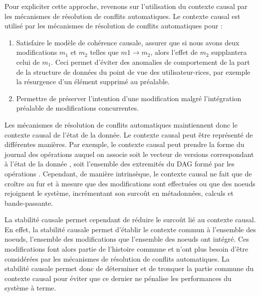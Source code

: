 Pour expliciter cette approche, revenons sur l'utilisation du contexte causal par les mécanismes de résolution de conflits automatiques.
Le contexte causal est utilisé par les mécanismes de résolution de conflits automatiques pour :
\begin{enumerate}
    \item Satisfaire le modèle de cohérence causale, \ie assurer que si nous avons deux modifications $m_1$ et $m_2$ telles que $m1 \to m_2$, alors l'effet de $m_2$ supplantera celui de $m_1$.
        Ceci permet d'éviter des anomalies de comportement de la part de la structure de données du point de vue des utilisateur-rices, par exemple la résurgence d'un élément supprimé au préalable.
    \item Permettre de préserver l'intention d'une modification malgré l'intégration préalable de modifications concurrentes.
\end{enumerate}


Les mécanismes de résolution de conflits automatiques maintiennent donc le contexte causal de l'état de la donnée.
Le contexte causal peut être représenté de différentes manières.
Par exemple, le contexte causal peut prendre la forme du journal des opérations auquel on associe soit le vecteur de versions correspondant à l'état de la donnée \cite{1988-version-vector-mattern,1991-version-vector-fidge}, soit l'ensemble des extremités du \ac{DAG} formé par les opérations \cite{1997-causal-barrier}.
Cependant, de manière intrinsèque, le contexte causal ne fait que de croître au fur et à mesure que des modifications sont effectuées ou que des noeuds rejoignent le système, incrémentant son surcoût en métadonnées, calculs et bande-passante.

La stabilité causale permet cependant de réduire le surcoût lié au contexte causal.
En effet, la stabilité causale permet d'établir le contexte commun à l'ensemble des noeuds, \ie l'ensemble des modifications que l'ensemble des noeuds ont intégré.
Ces modifications font alors partie de l'histoire commune et n'ont plus besoin d'être considérées par les mécanismes de résolution de conflits automatiques.
La stabilité causale permet donc de déterminer et de tronquer la partie commune du contexte causal pour éviter que ce dernier ne pénalise les performances du système à terme.\\

